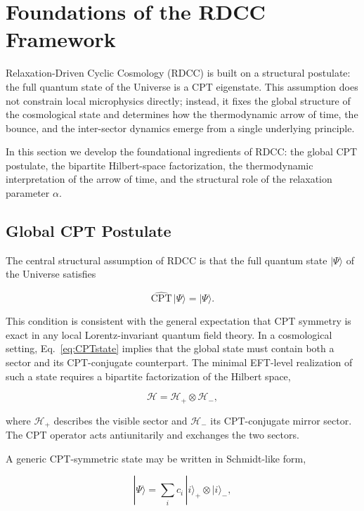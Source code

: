 \documentclass[11pt,a4paper]{article}
\begin{document}
\section{Foundations of the RDCC Framework}
\label{sec:foundations}

Relaxation-Driven Cyclic Cosmology (RDCC) is built on a structural postulate:
the full quantum state of the Universe is a CPT eigenstate. This assumption
does not constrain local microphysics directly; instead, it fixes the global
structure of the cosmological state and determines how the thermodynamic arrow
of time, the bounce, and the inter-sector dynamics emerge from a single
underlying principle.

In this section we develop the foundational ingredients of RDCC:
the global CPT postulate, the bipartite Hilbert-space factorization, the
thermodynamic interpretation of the arrow of time, and the structural role of
the relaxation parameter \( \alpha \).

\subsection{Global CPT Postulate}

The central structural assumption of RDCC is that the full quantum state
\(|\Psi\rangle\) of the Universe satisfies

\begin{equation}
\widehat{\mathrm{CPT}}\,|\Psi\rangle = |\Psi\rangle.
\label{eq:CPTstate}
\end{equation}

This condition is consistent with the general expectation that CPT symmetry is
exact in any local Lorentz-invariant quantum field theory. In a cosmological
setting, Eq.~\eqref{eq:CPTstate} implies that the global state must contain
both a sector and its CPT-conjugate counterpart. The minimal EFT-level
realization of such a state requires a bipartite factorization of the Hilbert
space,

\begin{equation}
\mathcal{H} = \mathcal{H}_{+} \otimes \mathcal{H}_{-},
\end{equation}

where \( \mathcal{H}_{+} \) describes the visible sector and \( \mathcal{H}_{-} \)
its CPT-conjugate mirror sector. The CPT operator acts antiunitarily and
exchanges the two sectors.

A generic CPT-symmetric state may be written in Schmidt-like form,

\begin{equation}
|\Psi\rangle = \sum_{i} c_{i}\,|i\rangle_{+} \otimes |i\rangle_{-},
\end{equation}
\end{document}
